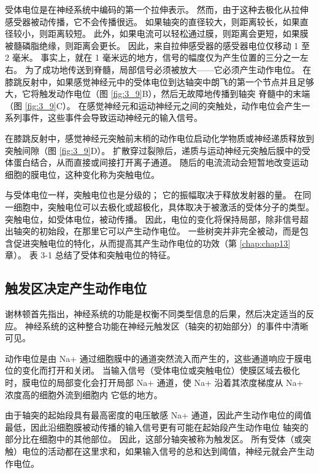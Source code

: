 受体电位是在神经系统中编码的第一个拉伸表示。 
然而，由于这种去极化从拉伸感受器被动传播，它不会传播很远。 
如果轴突的直径较大，则距离较长，如果直径较小，则距离较短。 
此外，如果电流可以轻松通过膜，则距离会更短，如果膜被髓磷脂绝缘，则距离会更长。 
因此，来自拉伸感受器的感受器电位仅移动 1 至 2 毫米。 
事实上，就在 1 毫米远的地方，信号的幅度仅为产生位置的三分之一左右。 
为了成功地传送到脊髓，局部信号必须被放大——它必须产生动作电位。 
在膝跳反射中，如果感觉神经元中的受体电位到达轴突中朗飞的第一个节点并且足够大，它将触发动作电位（图 \ref{fig:3_9}B），然后无故障地传播到轴突 脊髓中的末端（图 \ref{fig:3_9}C）。 
在感觉神经元和运动神经元之间的突触处，动作电位会产生一系列事件，这些事件会导致运动神经元的输入信号。


在膝跳反射中，感觉神经元突触前末梢的动作电位启动化学物质或神经递质释放到突触间隙（图 \ref{fig:3_9}D）。 
扩散穿过裂隙后，递质与运动神经元突触后膜中的受体蛋白结合，从而直接或间接打开离子通道。 
随后的电流流动会短暂地改变运动细胞的膜电位，这种变化称为突触电位。


与受体电位一样，突触电位也是分级的； 
它的振幅取决于释放发射器的量。 
在同一细胞中，突触电位可以去极化或超极化，具体取决于被激活的受体分子的类型。 
突触电位，如受体电位，被动传播。 
因此，电位的变化将保持局部，除非信号超出轴突的初始段，在那里它可以产生动作电位。 
一些树突并非完全被动，而是包含促进突触电位的特化，从而提高其产生动作电位的功效（第 \ref{chap:chap13} 章）。 
表 3-1 总结了受体和突触电位的特征。


\subsection{触发区决定产生动作电位}
谢林顿首先指出，神经系统的功能是权衡不同类型信息的后果，然后决定适当的反应。 
神经系统的这种整合功能在神经元触发区（轴突的初始部分）的事件中清晰可见。


动作电位是由 Na+ 通过细胞膜中的通道突然流入而产生的，这些通道响应于膜电位的变化而打开和关闭。 
当输入信号（受体电位或突触电位）使膜区域去极化时，膜电位的局部变化会打开局部 Na+ 通道，使 Na+ 沿着其浓度梯度从 Na+ 浓度高的细胞外流到细胞内 它低的地方。


由于轴突的起始段具有最高密度的电压敏感 Na+ 通道，因此产生动作电位的阈值最低，因此沿细胞膜被动传播的输入信号更有可能在起始段产生动作电位 轴突的部分比在细胞中的其他部位。 
因此，这部分轴突被称为触发区。 
所有受体（或突触）电位的活动都在这里求和，如果输入信号的总和达到阈值，神经元就会产生动作电位。


